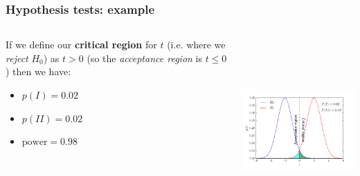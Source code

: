 \begin{frame}

\frametitle{Hypothesis tests: example}
\label{hypothesistests:example}

\begin{columns}
    \begin{column}{0.3\textwidth}

If we define our \textbf{critical region} for $t$ (i.e. where we \emph{reject} $H_0$) as $t>0$ (so the \emph{acceptance
region} is $t\le0$) then we have:

\begin{itemize}
\item $p(I) = 0.02$

\item $p(II) = 0.02$

\item $\text{power} = 0.98$

\end{itemize}

\end{column}
    \begin{column}{0.7\textwidth}

\includegraphics[keepaspectratio,width=\textwidth,height=200pt]{figures/hypothesis_test.pdf}
\end{column}
\end{columns}

\end{frame}

